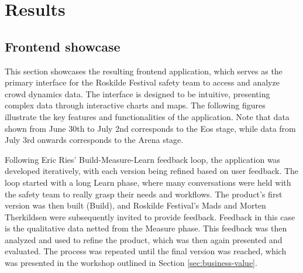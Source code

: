 \chapter{Results}
\label{chap:results}

\section{Frontend showcase}
\label{sec:frontend-showcase}

This section showcases the resulting frontend application, which serves as the primary interface for the Roskilde Festival safety team to access and analyze crowd dynamics data. The interface is designed to be intuitive, presenting complex data through interactive charts and maps. The following figures illustrate the key features and functionalities of the application. Note that data shown from June 30th to July 2nd corresponds to the Eos stage, while data from July 3rd onwards corresponds to the Arena stage.

Following Eric Ries' Build-Measure-Learn feedback loop, the application was developed iteratively, with each version being refined based on user feedback. The loop started with a long Learn phase, where many conversations were held with the safety team to really grasp their needs and workflows. The product's first version was then built (Build), and Roskilde Festival's Mads and Morten Therkildsen were subsequently invited to provide feedback. Feedback in this case is the qualitative data netted from the Measure phase. This feedback was then analyzed and used to refine the product, which was then again presented and evaluated. The process was repeated until the final version was reached, which was presented in the workshop outlined in Section \ref{sec:business-value}.

